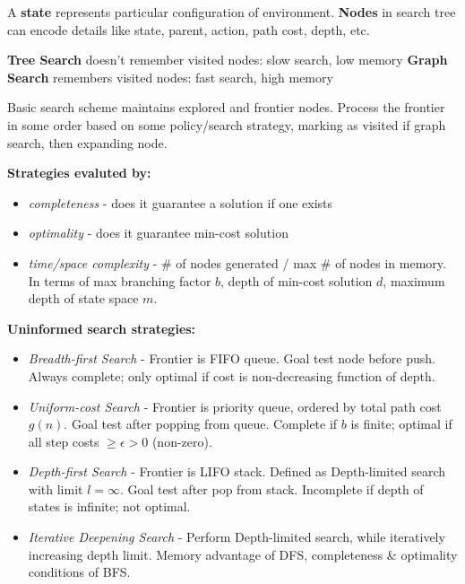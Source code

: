 \documentclass[a4paper,10pt,twocolumn]{article}
\begin{document}

\vspace{-1em}

\begin{tcolorbox}[title=Uninformed Search, module]
    A \textbf{state} represents particular configuration of environment. \textbf{Nodes} in search tree can encode details like state, parent, action, path cost, depth, etc.

    \textbf{Tree Search} doesn't remember visited nodes: slow search, low memory
    \textbf{Graph Search} remembers visited nodes: fast search, high memory

    Basic search scheme maintains explored and frontier nodes. Process the frontier in some order based on some policy/search strategy, marking as visited if graph search, then expanding node.

    \textbf{Strategies evaluted by:}
    \begin{itemize}
        \item \textit{completeness} - does it guarantee a solution if one exists
        \item \textit{optimality} - does it guarantee min-cost solution
        \item \textit{time/space complexity} - \# of nodes generated / max \# of nodes in memory. In terms of max branching factor $b$, depth of min-cost solution $d$, maximum depth of state space $m$.
    \end{itemize}

    \textbf{Uninformed search strategies:}
    \begin{itemize}
        \item \textit{Breadth-first Search} - Frontier is FIFO queue. Goal test node before push. Always complete; only optimal if cost is non-decreasing function of depth.
        \item \textit{Uniform-cost Search} - Frontier is priority queue, ordered by total path cost $g(n)$. Goal test after popping from queue. Complete if $b$ is finite; optimal if all step costs $\ge \epsilon > 0$ (non-zero).
        \item \textit{Depth-first Search} - Frontier is LIFO stack. Defined as Depth-limited search with limit $l = \infty$. Goal test after pop from stack. Incomplete if depth of states is infinite; not optimal.
        \item \textit{Iterative Deepening Search} - Perform Depth-limited search, while iteratively increasing depth limit. Memory advantage of DFS, completeness \& optimality conditions of BFS.
    \end{itemize}

\end{tcolorbox}
\end{document}
